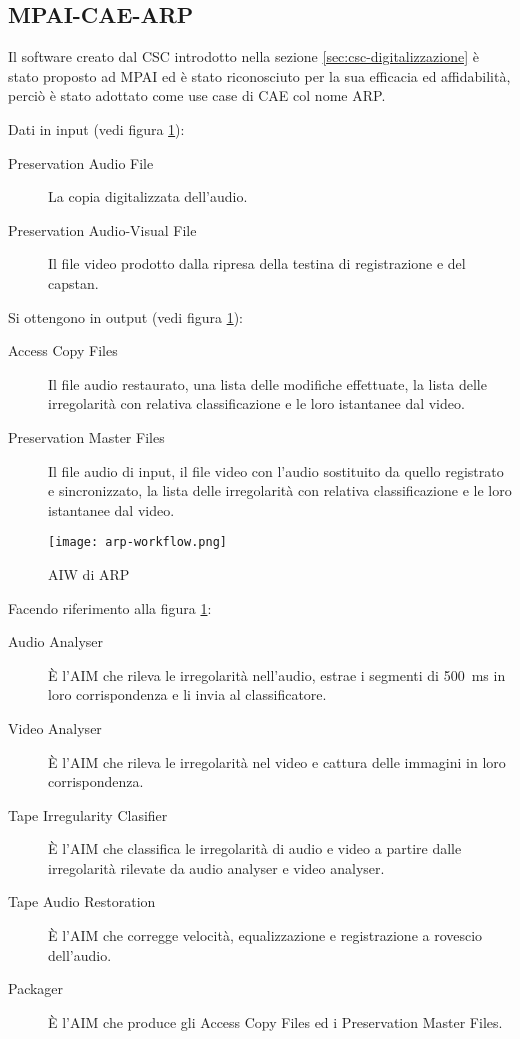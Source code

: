 \subsection{MPAI-CAE-ARP} \label{ssec:mpai-cae-arp} %
Il software creato dal \ac{CSC} introdotto nella sezione \ref{sec:csc-digitalizzazione} è stato proposto ad \ac{MPAI} ed è stato riconosciuto per la sua efficacia ed affidabilità, perciò è stato adottato come use case di \ac{CAE} col nome \acf{ARP}.

Dati in input (vedi figura \ref{fig:arp-workflow}):
\begin{description}
    \item[Preservation Audio File] La copia digitalizzata dell'audio.
    \item[Preservation Audio-Visual File] Il file video prodotto dalla ripresa della testina di registrazione e del capstan.
\end{description}

Si ottengono in output (vedi figura \ref{fig:arp-workflow}):
\begin{description}
    \item[Access Copy Files] Il file audio restaurato, una lista delle modifiche effettuate, la lista delle irregolarità con relativa classificazione e le loro istantanee dal video.
    \item[Preservation Master Files] Il file audio di input, il file video con l'audio sostituito da quello registrato e sincronizzato, la lista delle irregolarità con relativa classificazione e le loro istantanee dal video.
\end{description}

\begin{figure}
    \centering
    \texttt{[image: arp-workflow.png]}
    \caption{\ac{AIW} di \acl{ARP}}
    \label{fig:arp-workflow}
\end{figure}

Facendo riferimento alla figura \ref{fig:arp-workflow}:
\begin{description}
    \item[Audio Analyser] È l'\ac{AIM} che rileva le irregolarità nell'audio, estrae i segmenti di \qty{500}{\ms} in loro corrispondenza e li invia al classificatore.
    \item[Video Analyser] È l'\ac{AIM} che rileva le irregolarità nel video e cattura delle immagini in loro corrispondenza.
    \item[Tape Irregularity Clasifier] È l'\ac{AIM} che classifica le irregolarità di audio e video a partire dalle irregolarità rilevate da audio analyser e video analyser.   %
    \item[Tape Audio Restoration] È l'\ac{AIM} che corregge velocità, equalizzazione e registrazione a rovescio dell'audio.
    \item[Packager] È l'\ac{AIM} che produce gli Access Copy Files ed i Preservation Master Files.
\end{description}






